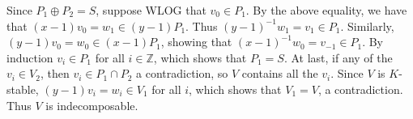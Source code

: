 \documentclass[12pt]{article}
\theoremstyle{definitionstyle}
\def\mbb#1{\mathbb{#1}}
\def\bZ{\mbb{Z}}
\begin{document}
\begin{enumerate}
		Since $P_1 \oplus P_2 = S$, suppose WLOG that $v_0 \in P_1$. By the above equality, we have that $(x-1)v_0 = w_1 \in (y-1)P_1$. Thus $(y-1)^{-1} w_1 = v_1 \in P_1$. Similarly, $(y-1)v_0 = w_0 \in (x-1)P_1$, showing that $(x-1)^{-1} w_0 = v_{-1} \in P_1$. By induction $v_i \in P_1$ for all $i \in \bZ$, which shows that $P_1 = S$. At last, if any of the $v_i \in V_2$, then $v_i \in P_1 \cap P_2$ a contradiction, so $V$ contains all the $v_i$. Since $V$ is $K$-stable, $(y-1)v_i = w_i \in V_1$ for all $i$, which shows that $V_1 = V$, a contradiction. Thus $V$ is indecomposable.
	\end{enumerate}
\end{document}
